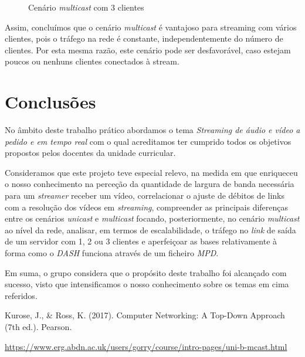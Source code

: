 \documentclass[a4paper, 11pt]{article}
\begin{document}
\begin{figure}[H]
    \centering
    \caption{Cenário \textit{multicast} com 3 clientes}
\end{figure}

Assim, concluímos que o cenário \textit{multicast} é vantajoso para streaming com vários clientes, pois o tráfego na rede é constante, independentemente do número de clientes. Por esta mesma razão, este cenário pode ser desfavorável, caso estejam poucos ou nenhuns clientes conectados à stream.


\clearpage
\section {Conclusões}

No âmbito deste trabalho prático abordamos o tema \textit{Streaming de áudio e vídeo a pedido e em tempo real} com o qual acreditamos ter cumprido todos os objetivos propostos pelos docentes da unidade curricular. 

Consideramos que este projeto teve especial relevo, na medida em que enriqueceu o nosso conhecimento na perceção da quantidade de largura de banda necessária para um \textit{streamer} receber um vídeo, correlacionar o ajuste de débitos de links com a resolução dos vídeos em \textit{streaming}, compreender as principais diferenças entre os cenários \textit{unicast} e \textit{multicast} focando, posteriormente, no cenário \textit{multicast} ao nível da rede, analisar, em termos de escalabilidade, o tráfego no \textit{link} de saída de um servidor com 1, 2 ou 3 clientes e aperfeiçoar as bases relativamente à forma como o \textit{DASH} funciona através de um ficheiro \textit{MPD}.

Em suma, o grupo considera que o propósito deste trabalho foi alcançado com sucesso, visto que intensificamos o nosso conhecimento sobre os temas em cima referidos.

\clearpage
\begin{thebibliography}{}

Kurose, J., \& Ross, K. (2017). Computer Networking: A Top-Down Approach (7th ed.). Pearson.

\url{https://www.erg.abdn.ac.uk/users/gorry/course/intro-pages/uni-b-mcast.html}

\end{thebibliography}
\end{document}
